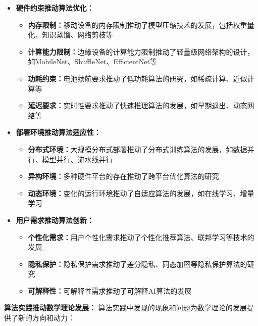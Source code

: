 \begin{itemize}
\item \textbf{硬件约束推动算法优化：}
\begin{itemize}
\item \textbf{内存限制：}移动设备的内存限制推动了模型压缩技术的发展，包括权重量化、知识蒸馏、网络剪枝等
\item \textbf{计算能力限制：}边缘设备的计算能力限制推动了轻量级网络架构的设计，如MobileNet、ShuffleNet、EfficientNet等
\item \textbf{功耗约束：}电池续航要求推动了低功耗算法的研究，如稀疏计算、近似计算等
\item \textbf{延迟要求：}实时性要求推动了快速推理算法的发展，如早期退出、动态网络等
\end{itemize}

\item \textbf{部署环境推动算法适应性：}
\begin{itemize}
\item \textbf{分布式环境：}大规模分布式部署推动了分布式训练算法的发展，如数据并行、模型并行、流水线并行
\item \textbf{异构环境：}多种硬件平台的存在推动了跨平台优化算法的研究
\item \textbf{动态环境：}变化的运行环境推动了自适应算法的发展，如在线学习、增量学习
\end{itemize}

\item \textbf{用户需求推动算法创新：}
\begin{itemize}
\item \textbf{个性化需求：}用户个性化需求推动了个性化推荐算法、联邦学习等技术的发展
\item \textbf{隐私保护：}隐私保护需求推动了差分隐私、同态加密等隐私保护算法的研究
\item \textbf{可解释性：}可解释性需求推动了可解释AI算法的发展
\end{itemize}
\end{itemize}

\textbf{算法实践推动数学理论发展：}
算法实践中发现的现象和问题为数学理论的发展提供了新的方向和动力：

